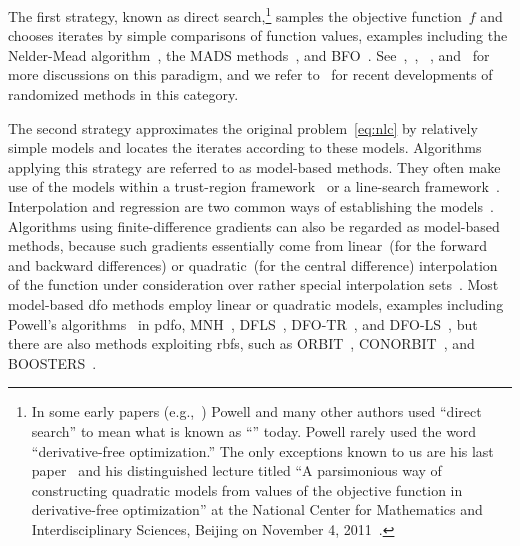 \documentclass[
    smallextended,  %
    draft,          %
    final,          %
]{svjour3}
\newcommand{\obj}{f}
\begin{document}
The first strategy, known as direct search,\footnote{In some early papers (e.g.,~\cite{Powell_1994,Powell_1998})
Powell and many other authors used ``direct search'' to mean what is known as ``'' today.
Powell rarely used the word ``derivative-free optimization.''
The only exceptions known to us are his last paper~\cite{Powell_2015} and his distinguished lecture
titled ``A parsimonious way of constructing quadratic models from values of the objective function in
derivative-free optimization'' at the National Center for Mathematics and Interdisciplinary Sciences,
Beijing on November 4, 2011~\cite{Buhmann_Fletcher_Iserles_Toint_2018}.}
samples the objective function~$\obj$ and chooses iterates by simple comparisons of function values, examples including
the Nelder-Mead algorithm~\cite{Nelder_Mead_1965}, the MADS methods~\cite{Audet_Dennis_2006,LeDigabel_2011}, and BFO~\cite{Porcelli_Toint_2017,Porcelli_Toint_2022}.
See~\cite{Kolda_Lewis_Torczon_2003},~\cite[Chapters~7 and~8]{Conn_Scheinberg_Vicente_2009b},
~\cite[Part~3]{Audet_Hare_2017}, and~\cite[\S~2.1]{Larson_Menickelly_Wild_2019} for more discussions
on this paradigm, and we refer to~\cite{Gratton_Etal_2015,Gratton_Etal_2019} for recent developments
of randomized methods in this category.

The second strategy approximates the original problem~\eqref{eq:nlc} by relatively simple models and locates the iterates according to these models.
Algorithms applying this strategy are referred to as model-based methods.
They often make use of the models within a trust-region framework~\cite{Conn_Scheinberg_Vicente_2009a} or a line-search framework~\cite{Berahas_Byrd_Nocedal_2019}.
Interpolation and regression are two common ways of establishing the models~\cite{Powell_2001,Conn_Scheinberg_Vicente_2008a,Conn_Scheinberg_Vicente_2008b,Wild_Regis_Shoemaker_2008,Bandeira_Scheinberg_Vicente_2012,Billups_Larson_Graf_2013,Regis_Wild_2017}.
Algorithms using finite-difference gradients can also be regarded as model-based
methods, because such gradients essentially come from linear~(for the forward and backward
differences) or quadratic~(for the central difference) interpolation of the function under
consideration over rather special interpolation sets~\cite[\S~1.4.3]{Ragonneau_2022}.
Most model-based \gls{dfo} methods employ linear or quadratic models, examples including
Powell's algorithms~\cite{Powell_1994,Powell_2002,Powell_2006,Powell_2009} in \gls{pdfo},
MNH~\cite{Wild_2008}, DFLS~\cite{Zhang_Conn_Scheinberg_2010},
DFO-TR~\cite{Bandeira_Scheinberg_Vicente_2012}, and DFO-LS~\cite{Cartis_Etal_2019,Hough_Roberts_2022},
but there are also methods exploiting \glspl{rbf}, such as ORBIT~\cite{Wild_Regis_Shoemaker_2008}, CONORBIT~\cite{Regis_Wild_2017}, and BOOSTERS~\cite{Oeuvray_Bierlaire_2009}.
\end{document}
